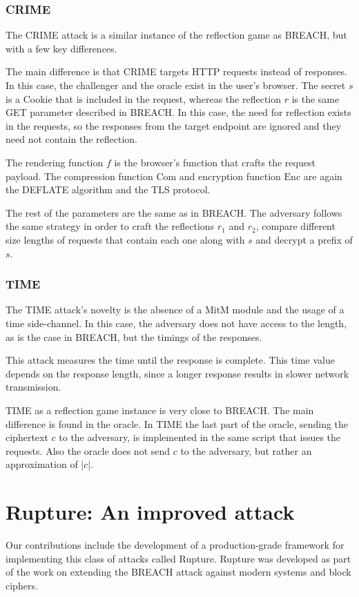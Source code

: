 \documentclass[conference, letterpaper, 10pt]{IEEEtran}
\begin{document}
\subsubsection{CRIME}
The CRIME attack is a similar instance of the reflection game as BREACH, but
with a few key differences.

The main difference is that CRIME targets HTTP requests instead of responses. In
this case, the challenger and the oracle exist in the user's browser. The secret
$s$ is a Cookie that is included in the request, whereas the reflection $r$ is
the same GET parameter described in BREACH. In this case, the need for
reflection exists in the requests, so the responses from the target endpoint are
ignored and they need not contain the reflection.

The rendering function $f$ is the browser's function that crafts the request
payload. The compression function $\textrm{Com}$ and encryption function
$\textrm{Enc}$ are again
the DEFLATE algorithm and the TLS protocol.

The rest of the parameters are the same as in BREACH. The adversary follows the
same strategy in order to craft the reflections $r_1$ and $r_2$, compare
different size lengths of requests that contain each one along with $s$ and
decrypt a prefix of $s$.

\subsubsection{TIME}
The TIME attack's novelty is the absence of a MitM module and the usage of a
time side-channel. In this case, the adversary does not have access to the
length, as is the case in BREACH, but the timings of the responses.

This attack measures the time until the response is complete. This time value
depends on the response length, since a longer response results in slower
network transmission.

TIME as a reflection game instance is very close to BREACH. The main difference
is found in the oracle. In TIME the last part of the oracle, sending the
ciphertext $c$ to the adversary, is implemented in the same script that issues the
requests. Also the oracle does not send $c$ to the adversary, but
rather an approximation of $\rvert c \rvert$.

\section{Rupture: An improved attack}\label{subsec:rupture}
Our contributions include the development of a production-grade
framework for implementing this class of attacks called Rupture.
Rupture was developed as part of the work on extending the BREACH attack against
modern systems and block ciphers.
\end{document}
